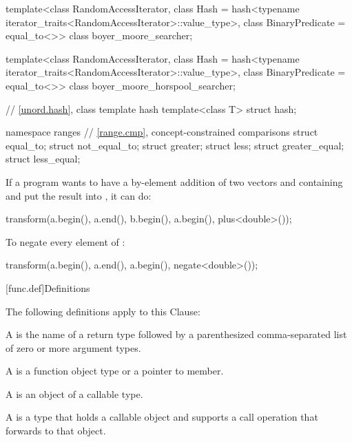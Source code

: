 \begin{codeblock}
{  template<class RandomAccessIterator,
           class Hash = hash<typename iterator_traits<RandomAccessIterator>::value_type>,
           class BinaryPredicate = equal_to<>>
    class boyer_moore_searcher;

  template<class RandomAccessIterator,
           class Hash = hash<typename iterator_traits<RandomAccessIterator>::value_type>,
           class BinaryPredicate = equal_to<>>
    class boyer_moore_horspool_searcher;

  // \ref{unord.hash}, class template hash
  template<class T>
    struct hash;

  namespace ranges {
    // \ref{range.cmp}, concept-constrained comparisons
    struct equal_to;
    struct not_equal_to;
    struct greater;
    struct less;
    struct greater_equal;
    struct less_equal;
  }
}
\end{codeblock}

\pnum
\begin{example}
If a \Cpp{} program wants to have a by-element addition of two vectors 
and  containing  and put the result into ,
it can do:

\begin{codeblock}
transform(a.begin(), a.end(), b.begin(), a.begin(), plus<double>());
\end{codeblock}
\end{example}

\pnum
\begin{example}
To negate every element of :

\begin{codeblock}
transform(a.begin(), a.end(), a.begin(), negate<double>());
\end{codeblock}

\end{example}

[func.def]{Definitions}

\pnum
The following definitions apply to this Clause:

\pnum
A  is the name of a return type followed by a
parenthesized comma-separated list of zero or more argument types.

\pnum
A  is a function object type or a pointer to member.

\pnum
A  is an object of a callable type.

\pnum
A  is a type that holds a callable object
and supports a call operation that forwards to that object.


